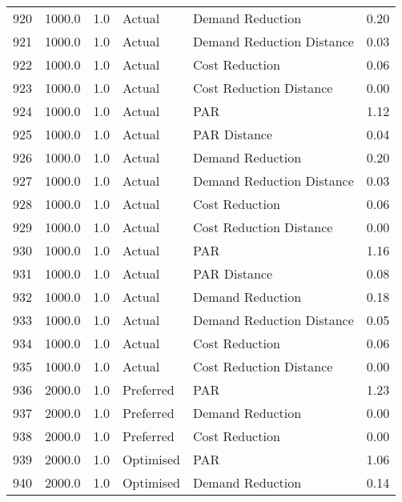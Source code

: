 \begin{longtable}{lrrllr}
920  &       1000.0 &     1.0 &         Actual &           Demand Reduction &   0.20 \\
921  &       1000.0 &     1.0 &         Actual &  Demand Reduction Distance &   0.03 \\
922  &       1000.0 &     1.0 &         Actual &             Cost Reduction &   0.06 \\
923  &       1000.0 &     1.0 &         Actual &    Cost Reduction Distance &   0.00 \\
924  &       1000.0 &     1.0 &         Actual &                        PAR &   1.12 \\
925  &       1000.0 &     1.0 &         Actual &               PAR Distance &   0.04 \\
926  &       1000.0 &     1.0 &         Actual &           Demand Reduction &   0.20 \\
927  &       1000.0 &     1.0 &         Actual &  Demand Reduction Distance &   0.03 \\
928  &       1000.0 &     1.0 &         Actual &             Cost Reduction &   0.06 \\
929  &       1000.0 &     1.0 &         Actual &    Cost Reduction Distance &   0.00 \\
930  &       1000.0 &     1.0 &         Actual &                        PAR &   1.16 \\
931  &       1000.0 &     1.0 &         Actual &               PAR Distance &   0.08 \\
932  &       1000.0 &     1.0 &         Actual &           Demand Reduction &   0.18 \\
933  &       1000.0 &     1.0 &         Actual &  Demand Reduction Distance &   0.05 \\
934  &       1000.0 &     1.0 &         Actual &             Cost Reduction &   0.06 \\
935  &       1000.0 &     1.0 &         Actual &    Cost Reduction Distance &   0.00 \\
936  &       2000.0 &     1.0 &      Preferred &                        PAR &   1.23 \\
937  &       2000.0 &     1.0 &      Preferred &           Demand Reduction &   0.00 \\
938  &       2000.0 &     1.0 &      Preferred &             Cost Reduction &   0.00 \\
939  &       2000.0 &     1.0 &      Optimised &                        PAR &   1.06 \\
940  &       2000.0 &     1.0 &      Optimised &           Demand Reduction &   0.14 \\

\end{longtable}
